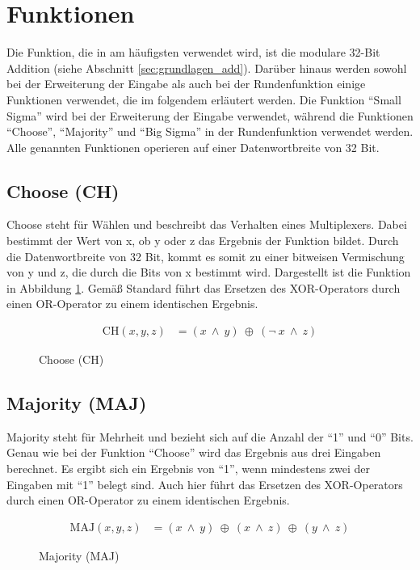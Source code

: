 \section{Funktionen}
\label{sec:sha256:funktionen}

Die Funktion, die in  am häufigsten verwendet wird, ist die modulare 32-Bit Addition (siehe Abschnitt \ref{sec:grundlagen_add}).
Darüber hinaus werden sowohl bei der Erweiterung der Eingabe als auch bei der Rundenfunktion einige Funktionen verwendet, die im folgendem erläutert werden.
Die Funktion "`Small Sigma"' wird bei der Erweiterung der Eingabe verwendet, während die Funktionen "`Choose"', "`Majority"' und "`Big Sigma"' in der Rundenfunktion
verwendet werden. Alle genannten Funktionen operieren auf einer Datenwortbreite von 32 Bit.


\subsection{Choose (CH)}
Choose steht für Wählen und beschreibt das Verhalten eines Multiplexers. Dabei bestimmt der Wert von x, ob y oder z das Ergebnis der Funktion bildet.
Durch die Datenwortbreite von 32 Bit, kommt es somit zu einer bitweisen Vermischung von y und z, die durch die Bits von x bestimmt wird. Dargestellt
ist die Funktion in Abbildung \ref{eq:ch}. Gemäß Standard \cite[10]{nist1804} führt das Ersetzen des XOR-Operators durch einen OR-Operator zu einem identischen Ergebnis.
\begin{figure}[!h]
  \begin{align}
  \text{CH}( x, y, z) &= (x~\wedge~y)~\oplus~( \neg~x~\wedge~z) \nonumber
  \end{align}
  \caption{Choose (CH)}
  \label{eq:ch}
\end{figure}

\subsection{Majority (MAJ)}
Majority steht für Mehrheit und bezieht sich auf die Anzahl der "`1"' und "`0"' Bits. Genau wie bei der Funktion "`Choose"' wird das Ergebnis aus drei Eingaben berechnet.
Es ergibt sich ein Ergebnis von "`1"', wenn mindestens zwei der Eingaben mit "`1"' belegt sind. Auch hier führt das Ersetzen des XOR-Operators durch einen OR-Operator zu
einem identischen Ergebnis.
\begin{figure}[!h]
  \begin{align}
  \text{MAJ}( x, y, z) &= (x~\wedge~y)~\oplus~(x~\wedge~z)~\oplus~(y~\wedge~z) \nonumber
  \end{align}
  \caption{Majority (MAJ)}
  \label{eq:maj}
\end{figure}

